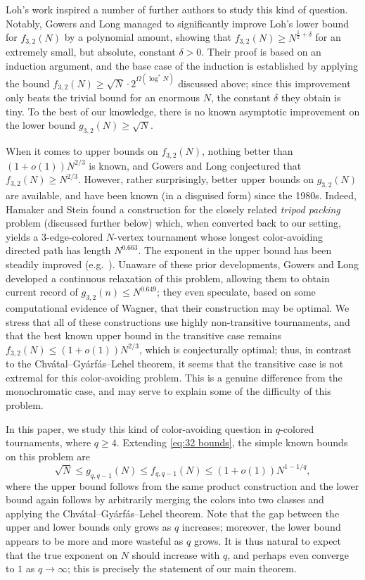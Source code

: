\documentclass[11pt,reqno]{amsart}
\theoremstyle{definition}
\newcommand\1{\mathbf{1}}
\let\leq\leqslant
\let\geq\geqslant
\begin{document}
Loh's work inspired a number of further authors \cite{MR4298506,1608.04153,MR4975150,MR3684779} to study this kind of question. Notably, Gowers and Long \cite{MR4298506} managed to significantly improve Loh's lower bound for $f_{3,2}(N)$ by a polynomial amount, showing that $f_{3,2}(N) \geq N^{\frac 12 + \delta}$ for an extremely small, but absolute, constant $\delta>0$. Their proof is based on an induction argument, and the base case of the induction is established by applying the bound $f_{3,2}(N) \geq \sqrt N \cdot 2^{\Omega(\log^* N)}$ discussed above; since this improvement only beats the trivial bound for an enormous $N$, the constant $\delta$ they obtain is tiny. To the best of our knowledge, there is no known asymptotic improvement on the lower bound $g_{3,2}(N) \geq \sqrt N$. 

When it comes to upper bounds on $f_{3,2}(N)$, nothing better than $(1+o(1))N^{2/3}$ is known, and Gowers and Long \cite{MR4298506} conjectured that $f_{3,2}(N) \geq N^{2/3}$. However, rather surprisingly, better upper bounds on $g_{3,2}(N)$ are available, and have been known (in a disguised form) since the 1980s. Indeed, Hamaker and Stein \cite{MR754867} found a construction for the closely related \emph{tripod packing} problem (discussed further below) which, when converted back to our setting, yields a $3$-edge-colored $N$-vertex tournament whose longest color-avoiding directed path has length $N^{0.663}$. 
The exponent in the upper bound has been steadily improved (e.g.\ \cite{MR2326159,intelligencer,MR1311249}). Unaware of these prior developments, Gowers and Long \cite{MR4298506} developed a continuous relaxation of this problem, allowing them to obtain current record of $g_{3,2}(n) \leq N^{0.649}$; they even speculate, based on some computational evidence of Wagner, that their construction may be optimal. We stress that all of these constructions use highly non-transitive tournaments, and that the best known upper bound in the transitive case remains $f_{3,2}(N) \leq (1+o(1))N^{2/3}$, which is conjecturally optimal; thus, in contrast to the Chv\'atal--Gy\'arf\'as--Lehel theorem, it seems that the transitive case is not extremal for this color-avoiding problem. This is a genuine difference from the monochromatic case, and may serve to explain some of the difficulty of this problem. 


In this paper, we study this kind of color-avoiding question in $q$-colored tournaments, where $q \geq 4$. Extending \eqref{eq:32 bounds}, the simple known bounds on this problem are
\[
    \sqrt N \leq g_{q,q-1}(N) \leq f_{q,q-1}(N) \leq (1+o(1)) N^{1-1/q},
\]
where the upper bound follows from the same product construction and the lower bound again follows by arbitrarily merging the colors into two classes and applying the Chv\'atal--Gy\'arf\'as--Lehel theorem. Note that the gap between the upper and lower bounds only grows as $q$ increases; moreover, the lower bound appears to be more and more wasteful as $q$ grows. It is thus natural to expect that the true exponent on $N$ should increase with $q$, and perhaps even converge to $1$ as $q \to \infty$; this is precisely the statement of our main theorem.
\end{document}
